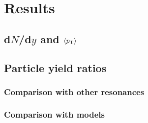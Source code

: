 \section{Results}
\subsection{d$N$/d$y$ and $\langle p_{\mathrm{T}}\rangle$}
\subsection{Particle yield ratios}
\subsubsection{Comparison with other resonances}
\subsubsection{Comparison with models}